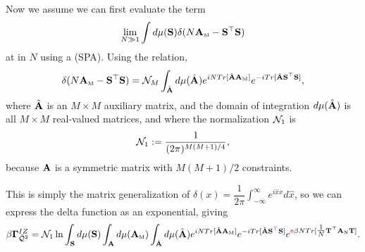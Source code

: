 Now we assume we can first evaluate the term 
\begin{align}
  \lim_{N\gg 1} \int d\mu({\mathbf{S}})    \delta(N{\mathbf{A}}_{\text{\tiny M}}-{\mathbf{S}}^{\top}{\mathbf{S}})
\end{align}
at \LargeN in $N$ using a \SaddlePointApproximation (SPA). Using the relation, 
\begin{align}
\delta(N{\mathbf{A}}_{\text{\tiny M}}-{\mathbf{S}}^{\top}{\mathbf{S}})
   =\mathcal{N}_M\int_{\hat{\mathbf{A}}}  d\mu(\hat{\mathbf{A}}) e^{ iN Tr[\hat{\mathbf{A}}{\mathbf{A}}_{\text{\tiny M}}] } e^{ -i Tr[\hat{\mathbf{A}}{\mathbf{S}}^{\top}{\mathbf{S}}] }  ,
\end{align}
where $\hat{\mathbf{A}}$ is an $M \times M$ auxiliary matrix, and the domain of integration $d\mu(\hat{\mathbf{A}})$ is all $M \times M$ real-valued matrices, and where the normalization $\mathcal{N}_1$ is
\begin{align}
  \label{eqn:norm_1}
\mathcal{N}_1:=\frac{1}{(2\pi)^{M(M+1)/4}},
\end{align}
because $\mathbf{A}$ is a symmetric matrix with $M(M+1)/2$ constraints.

This is simply the matrix generalization of
$\delta(x)=\dfrac{1}{2\pi}\int_{-\infty}^{\infty} e^{i\hat{x}x}d\hat{x}$,
so we can express the delta function as an exponential, giving
\begin{align}
\label{eqn:Q2}
\beta\mathbf{\Gamma}^{IZ}_{\bar{\mathcal{Q}}^{2}} = \mathcal{N}_1 \ln\int_{{\mathbf{S}}}  d\mu({\mathbf{S}}) \int_{\mathbf{A}} d\mu({\mathbf{A}}_{\text{\tiny M}}) 
                           \int_{\hat{\mathbf{A}}} d\mu(\hat{\mathbf{A}}) e^{ iN Tr[ \hat{\mathbf{A}}{\mathbf{A}}_{\text{\tiny M}} ] }
                           e^{ -i Tr[ \hat{\mathbf{A}}{\mathbf{S}}^{\top} {\mathbf{S}} ] }
                           e^{  {\color{red}\sf{n}}\beta N Tr[\tfrac{1}{N} {\mathbf{T}}^{\top}{\mathbf{A}}_{\text{\tiny N}}{\mathbf{T}} ] } .
\end{align}

